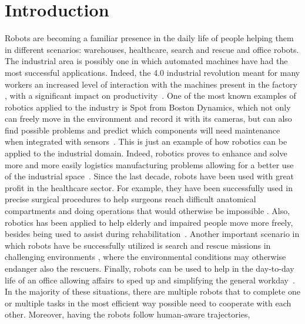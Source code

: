 \chapter{Introduction}
\label{ch:introduction}
Robots are becoming a familiar presence in the daily life of people helping
them in different scenarios: warehouses, healthcare, search and rescue and
office robots. \newline
The industrial area is possibly one in which automated machines have had the
most successful applications. Indeed, the 4.0 industrial revolution meant for
many workers an increased level of interaction with the machines present in the
factory \cite{industry4_0}, with a significant impact on
productivity~\cite{coordinationInWarehouse}. One of the most known examples of
robotics applied to the industry is Spot from Boston Dynamics, which not only
can freely move in the environment and record it with its cameras, but can also
find possible problems and predict which components will need maintenance when
integrated with sensors~\cite{bostonDynamics}. This is just an example of how
robotics can be applied to the industrial domain. Indeed, robotics proves to
enhance and solve more and more easily logistics manufacturing problems
allowing for a better use of the industrial
space~\cite{industry4_0_1}.\newline
Since the last decade, robots have been used with great profit in the
healthcare sector. For example, they have been successfully used in precise
surgical procedures to help surgeons reach difficult anatomical compartments
and doing operations that would otherwise be impossible \cite{surgicalRobot}.
Also, robotics has been applied to help elderly and impaired people move more
freely, besides being used to assist during rehabilitation~\cite{friWalker}.
\newline
Another important scenario in which robots have be successfully utilized is
search and rescue missions in challenging environments
\cite{searchRescueDrones}, where the environmental conditions may otherwise
endanger also the rescuers. \newline
Finally, robots can be used to help in the day-to-day life of an office
allowing affairs to sped up and simplifying the general workday~\cite{cobots}.
\newline
In the majority of these situations, there are multiple robots that to complete
one or multiple tasks in the most efficient way possible need to cooperate with 
each other. Moreover, having the robots follow human-aware trajectories, 

